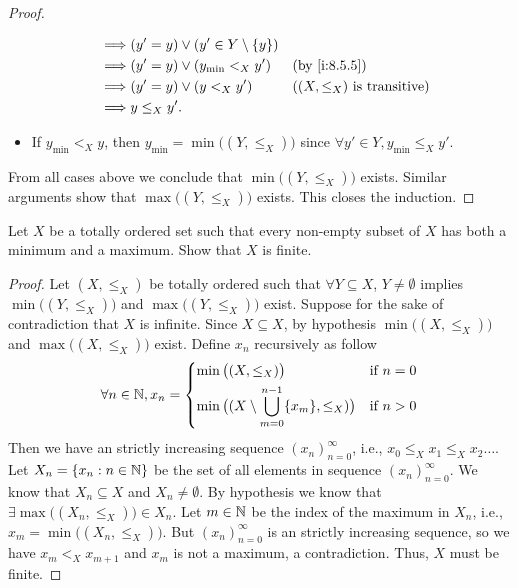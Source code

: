 \begin{proof}
\begin{itemize}
\begin{align*}
            \implies & (y' = y) \lor (y' \in Y \setminus \set{y})                                             \\
            \implies & (y' = y) \lor (y_{\min} <_X y')            &  & \by{i:8.5.5}                           \\
            \implies & (y' = y) \lor (y <_X y')                   &  & \text{(\((X, \leq_X)\) is transitive)} \\
            \implies & y \leq_X y'.
          \end{align*}
    \item If \(y_{\min} <_X y\), then \(y_{\min} = \min\big((Y, \leq_X)\big)\) since \(\forall y' \in Y, y_{\min} \leq_X y'\).
  \end{itemize}
  From all cases above we conclude that \(\min\big((Y, \leq_X)\big)\) exists.
  Similar arguments show that \(\max\big((Y, \leq_X)\big)\) exists.
  This closes the induction.
\end{proof}

\begin{ex}\label{i:ex:8.5.9}
  Let \(X\) be a totally ordered set such that every non-empty subset of \(X\) has both a minimum and a maximum.
  Show that \(X\) is finite.
\end{ex}

\begin{proof}
  Let \((X, \leq_X)\) be totally ordered such that \(\forall Y \subseteq X\), \(Y \neq \emptyset\) implies \(\min\big((Y, \leq_X)\big)\) and \(\max\big((Y, \leq_X)\big)\) exist.
  Suppose for the sake of contradiction that \(X\) is infinite.
  Since \(X \subseteq X\), by hypothesis \(\min\big((X, \leq_X)\big)\) and \(\max\big((X, \leq_X)\big)\) exist.
  Define \(x_n\) recursively as follow
  \[
    \forall n \in \N, x_n = \begin{dcases}
      \min\big((X, \leq_X)\big)                                             & \text{if } n = 0 \\
      \min\big((X \setminus \bigcup_{m = 0}^{n - 1} \set{x_m}, \leq_X)\big) & \text{if } n > 0
    \end{dcases}
  \]
  Then we have an strictly increasing sequence \((x_n)_{n = 0}^\infty\), i.e., \(x_0 \leq_X x_1 \leq_X x_2 \dots\).
  Let \(X_n = \left\lbrace x_n : n \in \mathbb{N}\right\rbrace\) be the set of all elements in sequence \((x_n)_{n = 0}^\infty\).
  We know that \(X_n \subseteq X\) and \(X_n \neq \emptyset\).
  By hypothesis we know that \(\exists \max\big((X_n, \leq_X)\big) \in X_n\).
  Let \(m \in \mathbb{N}\) be the index of the maximum in \(X_n\), i.e., \(x_m = \min\big((X_n, \leq_X)\big)\).
  But \((x_n)_{n = 0}^\infty\) is an strictly increasing sequence, so we have \(x_m <_X x_{m + 1}\) and \(x_m\) is not a maximum, a contradiction.
  Thus, \(X\) must be finite.
\end{proof}

